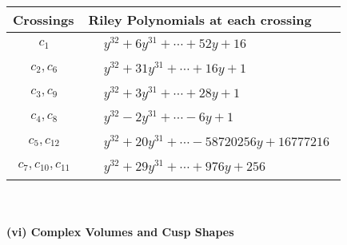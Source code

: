 \documentclass[1p]{elsarticle_modified}
\theoremstyle{definition}
\begin{document}
\begin{tabular}{m{50pt}|m{274pt}}
Crossings & \hspace{64pt}Riley Polynomials at each crossing \\
\hline $$\begin{aligned}c_{1}\end{aligned}$$&$\begin{aligned}
&y^{32}+6 y^{31}+\cdots+52 y+16
\end{aligned}$\\
\hline $$\begin{aligned}c_{2},c_{6}\end{aligned}$$&$\begin{aligned}
&y^{32}+31 y^{31}+\cdots+16 y+1
\end{aligned}$\\
\hline $$\begin{aligned}c_{3},c_{9}\end{aligned}$$&$\begin{aligned}
&y^{32}+3 y^{31}+\cdots+28 y+1
\end{aligned}$\\
\hline $$\begin{aligned}c_{4},c_{8}\end{aligned}$$&$\begin{aligned}
&y^{32}-2 y^{31}+\cdots-6 y+1
\end{aligned}$\\
\hline $$\begin{aligned}c_{5},c_{12}\end{aligned}$$&$\begin{aligned}
&y^{32}+20 y^{31}+\cdots-58720256 y+16777216
\end{aligned}$\\
\hline $$\begin{aligned}c_{7},c_{10},c_{11}\end{aligned}$$&$\begin{aligned}
&y^{32}+29 y^{31}+\cdots+976 y+256
\end{aligned}$\\
\hline
\end{tabular}\\~\\
\newpage\flushleft \textbf{(vi) Complex Volumes and Cusp Shapes}
\end{document}

